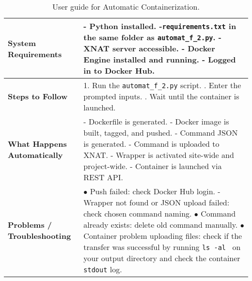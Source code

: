 \begin{table}[H]
  \centering
  \caption{ User guide for Automatic Containerization.}
  \label{tab:automatic_script}
  \begin{tabular}{|l|p{9cm}|}
  \hline
  \textbf{System Requirements} & 
  - Python installed. \newline
  -\texttt{requirements.txt} in the same folder as \texttt{automat\_f\_2.py}. \newline
  - XNAT server accessible. \newline
  - Docker Engine installed and running. \newline
  - Logged in to Docker Hub. \\  \hline
  \textbf{Steps to Follow} & 
  1. Run the \texttt{automat\_f\_2.py} script. \newline
  2. Enter the prompted inputs. \newline
  3. Wait until the container is launched. \\
  \hline
  \textbf{What Happens Automatically} & 
  - Dockerfile is generated. \newline
  - Docker image is built, tagged, and pushed. \newline
  - Command JSON is generated. \newline
  - Command is uploaded to XNAT. \newline
  - Wrapper is activated site-wide and project-wide. \newline
  - Container is launched via REST API. \\
  \hline
  \textbf{Problems / Troubleshooting} & 
  $\bullet$ Push failed: check Docker Hub login. \newline
  - Wrapper not found or JSON upload failed: check chosen command naming. \newline
  $\bullet$ Command already exists: delete old command manually. \newline
  $\bullet$ Container problem uploading files: check if the transfer was successful by running \texttt{ls -al \*} on your output directory and check the container \texttt{stdout} log. \\
  \hline
  \end{tabular}
\end{table}


\normalsize
